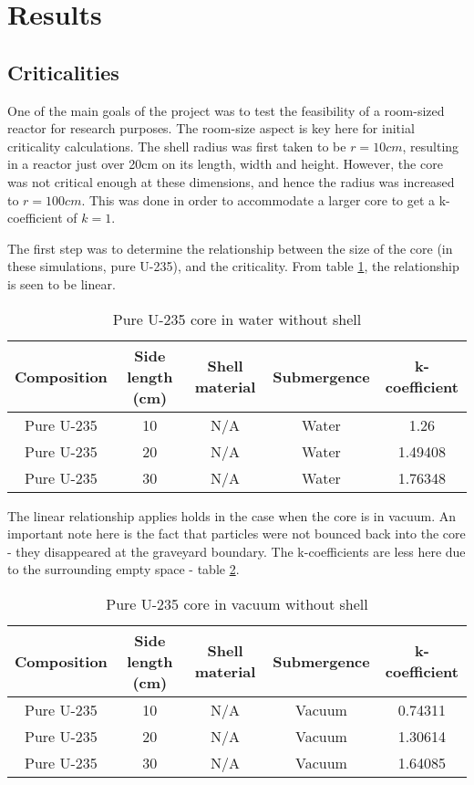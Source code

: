 \label{sec:results}
\section{Results}

\subsection{Criticalities}

One of the main goals of the project was to test the feasibility of a room-sized reactor for research purposes. The room-size aspect is key here for initial criticality calculations. The shell radius was first taken to be $r=10cm$, resulting in a reactor just over 20cm on its length, width and height. However, the core was not critical enough at these dimensions, and hence the radius was increased to $r=100cm$. This was done in order to accommodate a larger core to get a k-coefficient of $k=1$.

The first step was to determine the relationship between the size of the core (in these simulations, pure U-235), and the criticality. From table \ref{tab:pure}, the relationship is seen to be linear.

\begin{table}[!htbp]
\centering
\caption{Pure U-235 core in water without shell}
\label{tab:pure}
\begin{tabular}{|c|c|c|c|c|}
\hline
Composition & Side length (cm) & Shell material & Submergence & k-coefficient \\
\hline
Pure U-235  & 10               & N/A            & Water       & 1.26          \\
\hline
Pure U-235  & 20               & N/A            & Water       & 1.49408       \\
\hline
Pure U-235  & 30               & N/A            & Water       & 1.76348       \\
\hline
\end{tabular}
\end{table}

The linear relationship applies holds in the case when the core is in vacuum. An important note here is the fact that particles were not bounced back into the core - they disappeared at the graveyard boundary. The k-coefficients are less here due to the surrounding empty space - table \ref{tab:purevac}.

\begin{table}[!htbp]
\centering
\caption{Pure U-235 core in vacuum without shell}
\label{tab:purevac}
\begin{tabular}{|c|c|c|c|c|}
\hline
Composition & Side length (cm) & Shell material & Submergence & k-coefficient \\
\hline
Pure U-235  & 10               & N/A            & Vacuum       & 0.74311      \\
\hline
Pure U-235  & 20               & N/A            & Vacuum       & 1.30614       \\
\hline
Pure U-235  & 30               & N/A            & Vacuum       & 1.64085       \\
\hline
\end{tabular}
\end{table}

